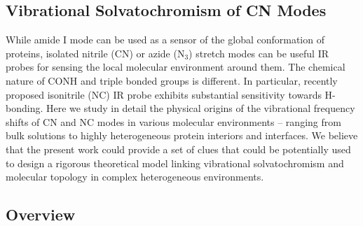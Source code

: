 \documentclass[b5paper,oneside,fleqn,11pt]{book}
\begin{document}

\begin{refsection}

\chapter{Vibrational Solvatochromism of CN Modes\label{c:cn-modes}}

While amide I mode can be used as a sensor of the global conformation
of proteins, isolated nitrile (CN) or azide (N$_3$) 
stretch modes can be useful IR probes for sensing the local molecular environment
around them. The chemical nature of CONH and triple bonded groups
is different. In particular, recently proposed isonitrile (NC) 
IR probe exhibits substantial sensitivity towards H-bonding.
Here we study in detail the physical origins
of the vibrational frequency shifts of CN and NC modes
in various molecular environments -- ranging from bulk solutions
to highly heterogeneous protein interiors and interfaces.
We believe that the present work could provide a set of clues 
that could be potentially used to design a rigorous
theoretical model linking vibrational solvatochromism 
and molecular topology in complex heterogeneous environments.

\section{Overview}


\end{refsection}
\end{document}
